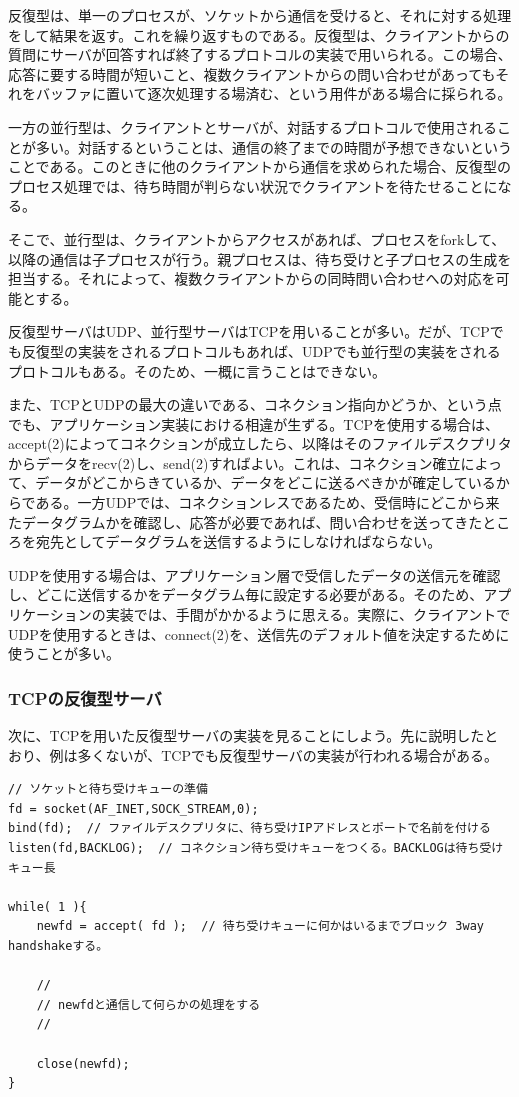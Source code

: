反復型は、単一のプロセスが、ソケットから通信を受けると、それに対する処理をして結果を返す。これを繰り返すものである。反復型は、クライアントからの質問にサーバが回答すれば終了するプロトコルの実装で用いられる。この場合、応答に要する時間が短いこと、複数クライアントからの問い合わせがあってもそれをバッファに置いて逐次処理する場済む、という用件がある場合に採られる。

一方の並行型は、クライアントとサーバが、対話するプロトコルで使用されることが多い。対話するということは、通信の終了までの時間が予想できないということである。このときに他のクライアントから通信を求められた場合、反復型のプロセス処理では、待ち時間が判らない状況でクライアントを待たせることになる。

そこで、並行型は、クライアントからアクセスがあれば、プロセスをforkして、以降の通信は子プロセスが行う。親プロセスは、待ち受けと子プロセスの生成を担当する。それによって、複数クライアントからの同時問い合わせへの対応を可能とする。

反復型サーバはUDP、並行型サーバはTCPを用いることが多い。だが、TCPでも反復型の実装をされるプロトコルもあれば、UDPでも並行型の実装をされるプロトコルもある。そのため、一概に言うことはできない。

また、TCPとUDPの最大の違いである、コネクション指向かどうか、という点でも、アプリケーション実装における相違が生ずる。TCPを使用する場合は、 accept(2)によってコネクションが成立したら、以降はそのファイルデスクプリタからデータをrecv(2)し、send(2)すればよい。これは、コネクション確立によって、データがどこからきているか、データをどこに送るべきかが確定しているからである。一方UDPでは、コネクションレスであるため、受信時にどこから来たデータグラムかを確認し、応答が必要であれば、問い合わせを送ってきたところを宛先としてデータグラムを送信するようにしなければならない。

UDPを使用する場合は、アプリケーション層で受信したデータの送信元を確認し、どこに送信するかをデータグラム毎に設定する必要がある。そのため、アプリケーションの実装では、手間がかかるように思える。実際に、クライアントでUDPを使用するときは、connect(2)を、送信先のデフォルト値を決定するために使うことが多い。


\subsubsection{TCPの反復型サーバ}
次に、TCPを用いた反復型サーバの実装を見ることにしよう。先に説明したとおり、例は多くないが、TCPでも反復型サーバの実装が行われる場合がある。

{\scriptsize
\begin{verbatim}
// ソケットと待ち受けキューの準備
fd = socket(AF_INET,SOCK_STREAM,0);
bind(fd);  // ファイルデスクプリタに、待ち受けIPアドレスとポートで名前を付ける
listen(fd,BACKLOG);  // コネクション待ち受けキューをつくる。BACKLOGは待ち受けキュー長

while( 1 ){
    newfd = accept( fd );  // 待ち受けキューに何かはいるまでブロック 3way handshakeする。

    //
    // newfdと通信して何らかの処理をする
    //

    close(newfd);
}
\end{verbatim}
}

